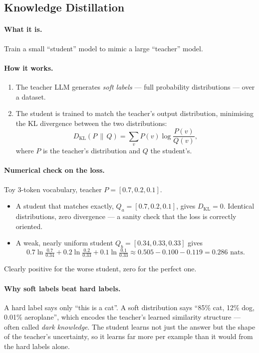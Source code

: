 \documentclass[11pt,a4paper]{article}
\begin{document}
\subsection{Knowledge Distillation}

\paragraph{What it is.} Train a small ``student'' model to mimic a large ``teacher'' model.

\paragraph{How it works.}
\begin{enumerate}
\item The teacher LLM generates \emph{soft labels} --- full probability distributions --- over
  a dataset.
\item The student is trained to match the teacher's output distribution, minimising the KL
  divergence between the two distributions:
  \[
  D_{\mathrm{KL}}(P \,\|\, Q) = \sum_v P(v) \log \frac{P(v)}{Q(v)},
  \]
  where $P$ is the teacher's distribution and $Q$ the student's.
\end{enumerate}

\paragraph{Numerical check on the loss.} Toy 3-token vocabulary, teacher
$P = [0.7, 0.2, 0.1]$.
\begin{itemize}
\item A student that matches exactly, $Q_a = [0.7, 0.2, 0.1]$, gives
  $D_{\mathrm{KL}} = 0$. Identical distributions, zero divergence --- a sanity check that the
  loss is correctly oriented.
\item A weak, nearly uniform student $Q_b = [0.34, 0.33, 0.33]$ gives
  \[
  0.7\ln\tfrac{0.7}{0.34} + 0.2\ln\tfrac{0.2}{0.33} + 0.1\ln\tfrac{0.1}{0.33}
  \approx 0.505 - 0.100 - 0.119 = 0.286 \text{ nats}.
  \]
\end{itemize}
Clearly positive for the worse student, zero for the perfect one.

\paragraph{Why soft labels beat hard labels.} A hard label says only ``this is a cat''. A soft
distribution says ``85\% cat, 12\% dog, 0.01\% aeroplane'', which encodes the teacher's
learned similarity structure --- often called \emph{dark knowledge}. The student learns not
just the answer but the shape of the teacher's uncertainty, so it learns far more per example
than it would from the hard labels alone.
\end{document}
